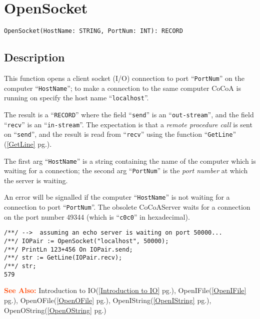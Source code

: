 \documentclass[a4paper]{mybook}
\newenvironment{command}{}{} %
\newcommand\SeeAlso{\par\textcolor{OrangeRed}{\textbf{\large See Also: }}}
\begin{document}
\section{OpenSocket}
\label{OpenSocket}
\begin{command} %


\begin{Verbatim}[label=syntax, rulecolor=\color{MidnightBlue},
frame=single]
OpenSocket(HostName: STRING, PortNum: INT): RECORD
\end{Verbatim}


\subsection*{Description}

This function opens a client socket (I/O) connection to port ``\verb&PortNum&''
on the computer ``\verb&HostName&''; to make a connection to the same computer
CoCoA is running on specify the host name ``\verb&localhost&''.
\par 
The result is a ``\verb&RECORD&'' where the field ``\verb&send&'' is an ``\verb&out-stream&'',
and the field ``\verb&recv&'' is an ``\verb&in-stream&''.  The expectation is that a
\textit{remote procedure call} is sent on ``\verb&send&'', and the result is read from
``\verb&recv&'' using the function ``\verb&GetLine&'' (\ref{GetLine} pg.\pageref{GetLine}).
\par 
The first arg ``\verb&HostName&'' is a string containing the name of the
computer which is waiting for a connection; the second arg ``\verb&PortNum&''
is the \textit{port number} at which the server is waiting.
\par 
An error will be signalled if the computer ``\verb&HostName&'' is not waiting
for a connection to port ``\verb&PortNum&''.  The obsolete CoCoAServer waits for
a connection on the port number 49344 (which is ``\verb&c0c0&'' in hexadecimal).
\begin{Verbatim}[label=example, rulecolor=\color{PineGreen}, frame=single]
/**/ -->  assuming an echo server is waiting on port 50000...
/**/ IOPair := OpenSocket("localhost", 50000);
/**/ PrintLn 123+456 On IOPair.send;
/**/ str := GetLine(IOPair.recv);
/**/ str;
579
\end{Verbatim}


\SeeAlso %
  Introduction to IO(\ref{Introduction to IO} pg.\pageref{Introduction to IO}), 
    OpenIFile(\ref{OpenIFile} pg.\pageref{OpenIFile}), 
    OpenOFile(\ref{OpenOFile} pg.\pageref{OpenOFile}), 
    OpenIString(\ref{OpenIString} pg.\pageref{OpenIString}), 
    OpenOString(\ref{OpenOString} pg.\pageref{OpenOString})
\end{command} %
\end{document}
